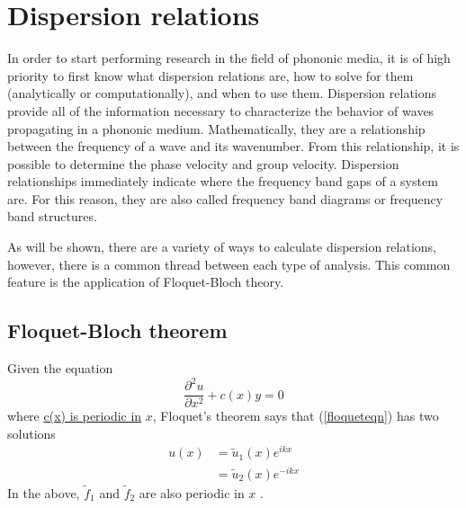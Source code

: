 \documentclass{article}
\begin{document}

\section{Dispersion relations}
In order to start performing research in the field of phononic media, it is of 
high priority to first know what dispersion relations are, how to solve for 
them (analytically or computationally), and when to use them. Dispersion 
relations provide all of the information necessary to characterize 
the behavior of waves propagating in a phononic medium. Mathematically, they 
are a relationship between the frequency of a wave and its wavenumber. From 
this relationship, it is possible to determine the phase velocity and group 
velocity. Dispersion relationships immediately indicate where the frequency 
band gaps of a system are. For this reason, they are also called frequency band 
diagrams or frequency band structures.

As will be shown, there are a variety of ways to calculate dispersion 
relations, however, there is a common thread between each type of analysis. 
This common feature is the application of Floquet-Bloch theory.

\subsection{Floquet-Bloch theorem} \label{fbt}
Given the equation
\begin{equation} \label{floqueteqn}
\frac{\partial^2 u}{\partial x^2} + c(x)y = 0
\end{equation}
where \underline{c(x) is periodic in} $x$, Floquet's theorem says that 
(\ref{floqueteqn}) has two solutions
\begin{align*}
u(x) &= \tilde{u}_1(x)e^{ikx} \\
&= \tilde{u}_2(x)e^{-ikx}
\end{align*}
In the above, $\tilde{f}_1$ and $\tilde{f}_2$ are also periodic in $x$ 
\cite{magnus79}.
\end{document}

